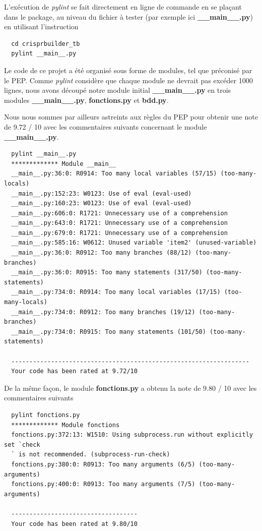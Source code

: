 \documentclass[twoside,a4paper,11pt,frenchb,openany]{report}
\begin{document}
L'exécution de \textit{pylint} se fait directement en ligne de commande en se plaçant dans le package, au niveau du fichier à tester (par exemple ici \textbf{\_\_main\_\_.py}) en utilisant l'instruction

\begin{verbatim}  cd crisprbuilder_tb
  pylint __main__.py
\end{verbatim}

Le code de ce projet a été organisé sous forme de modules, tel que préconisé par le PEP. Comme \textit{pylint} considère que chaque module ne devrait pas excéder 1000 lignes, nous avons découpé notre module initial \textbf{\_\_main\_\_.py} en trois modules \textbf{\_\_main\_\_.py}, \textbf{fonctions.py} et \textbf{bdd.py}.

Nous nous sommes par ailleurs astreints aux règles du PEP pour obtenir une note de 9.72 / 10 avec les commentaires suivants concernant le module \textbf{\_\_main\_\_.py}. 

\begin{verbatim}  pylint __main__.py
  ************* Module __main__
  __main__.py:36:0: R0914: Too many local variables (57/15) (too-many-locals)
  __main__.py:152:23: W0123: Use of eval (eval-used)
  __main__.py:160:23: W0123: Use of eval (eval-used)
  __main__.py:606:0: R1721: Unnecessary use of a comprehension
  __main__.py:643:0: R1721: Unnecessary use of a comprehension
  __main__.py:679:0: R1721: Unnecessary use of a comprehension
  __main__.py:585:16: W0612: Unused variable 'item2' (unused-variable)
  __main__.py:36:0: R0912: Too many branches (88/12) (too-many-branches)
  __main__.py:36:0: R0915: Too many statements (317/50) (too-many-statements)
  __main__.py:734:0: R0914: Too many local variables (17/15) (too-many-locals)
  __main__.py:734:0: R0912: Too many branches (19/12) (too-many-branches)
  __main__.py:734:0: R0915: Too many statements (101/50) (too-many-statements)

  ------------------------------------------------------------------
  Your code has been rated at 9.72/10\end{verbatim}

De la même façon, le module \textbf{fonctions.py} a obtenu la note de 9.80 / 10 avec les commentaires suivants

\begin{verbatim}  pylint fonctions.py
  ************* Module fonctions
  fonctions.py:372:13: W1510: Using subprocess.run without explicitly set `check
  ` is not recommended. (subprocess-run-check)
  fonctions.py:380:0: R0913: Too many arguments (6/5) (too-many-arguments)
  fonctions.py:400:0: R0913: Too many arguments (7/5) (too-many-arguments)

  -----------------------------------
  Your code has been rated at 9.80/10\end{verbatim}
\end{document}
